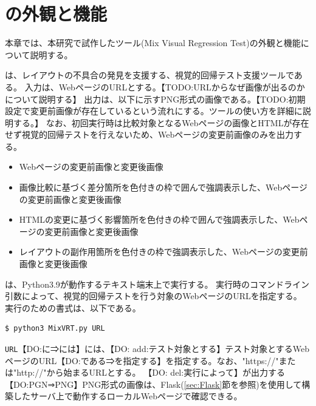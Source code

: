 \chapter{ \toolName の外観と機能}\label{cha:Function}
本章では、本研究で試作したツール\toolName (Mix Visual Regression Test)の外観と機能について説明する。

\toolName は、レイアウトの不具合の発見を支援する、視覚的回帰テスト支援ツールである。
入力は、WebページのURLとする。【TODO:URLからなぜ画像が出るのかについて説明する】
出力は、以下に示すPNG形式の画像である。【TODO:初期設定で変更前画像が存在しているという流れにする。ツールの使い方を詳細に説明する。】
なお、\toolName 初回実行時は比較対象となるWebページの画像とHTMLが存在せず視覚的回帰テストを行えないため、Webページの変更前画像のみを出力する。
\begin{itemize}
    \item Webページの変更前画像と変更後画像
    \item 画像比較に基づく差分箇所を色付きの枠で囲んで強調表示した、Webページの変更前画像と変更後画像
    \item HTMLの変更に基づく影響箇所を色付きの枠で囲んで強調表示した、Webページの変更前画像と変更後画像
    \item レイアウトの副作用箇所を色付きの枠で強調表示した、Webページの変更前画像と変更後画像
\end{itemize}

\toolName は、Python3.9\cite{Python}が動作するテキスト端末上で実行する。
\toolName 実行時のコマンドライン引数によって、視覚的回帰テストを行う対象のWebページのURLを指定する。
\toolName 実行のための書式は、以下である。
\begin{lstlisting}[label=list:command,frame=none,numbers=none,basicstyle={\normalsize \ttfamily \color[gray]{.15}}]
  $ python3 MixVRT.py URL
 \end{lstlisting}
{\tt URL}【DO:に⇒には】には、【DO: add:テスト対象とする】テスト対象とするWebページのURL【DO:である⇒を指定する】を指定する。なお、"https://"または"http://"から始まるURLとする。
【DO: del:\toolName 実行によって】\toolName が出力する【DO:PGN⇒PNG】PNG形式の画像は、Flask(\ref{sec:Flask}節を参照)を使用して構築したサーバ上で動作するローカルWebページで確認できる。

